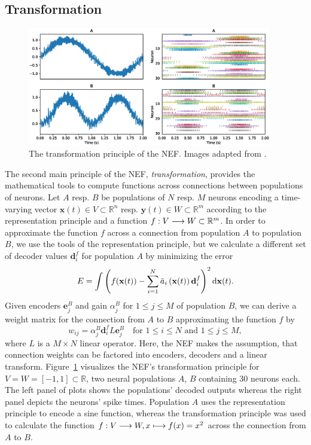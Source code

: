 \subsection{Transformation}
\begin{figure}[t]
	\centering
	\includegraphics[width=0.95\textwidth]{imgs/NEF_transformation.eps}
	\caption{The transformation principle of the \ac{NEF}.
    Images adapted from \textcite{Nengo}.}
	\label{fig:nef_transformation}
\end{figure}
The second main principle of the \ac{NEF}, \emph{transformation}, provides the mathematical tools to compute functions across connections between populations of neurons.
Let $A$ resp. $B$ be populations of $N$ resp. $M$ neurons encoding a time-varying vector $\mathbf{x}(t) \in V \subset \mathbb{R}^{n}$ resp. $\mathbf{y}(t) \in W \subset \mathbb{R}^{m}$ according to the representation principle and a function $f: V \longrightarrow W \subset \mathbb{R}^{m}$.
In order to approximate the function $f$ across a connection from population $A$ to population $B$, we use the tools of the representation principle, but we calculate a different set of decoder values $\mathbf{d}_{i}^{f}$ for population $A$ by minimizing the error
\begin{equation}
\label{eq:nef_transformation}
E = \int \left( f(\mathbf{x}(t)) - \sum_{i=1}^{N} \tilde{a}_{i}\left(\mathbf{x}(t)\right) \mathbf{d}_{i}^{f}\right)^{2} \mathop{}\!\mathrm{d} \mathbf{x}(t).
\end{equation}
Given encoders $\mathbf{e}_{j}^{B}$ and gain $\alpha_{j}^{B}$ for $1 \leq j \leq M$ of population $B$, we can derive a weight matrix for the connection from $A$ to $B$ approximating the function $f$ by
\begin{equation}
w_{ij} = \alpha_{j}^{B} \mathbf{d}_{i}^{f} L \mathbf{e}_{j}^{B} \quad \textrm{for } 1 \leq i \leq N \textrm{ and } 1 \leq j \leq M,
\end{equation}
where $L$ is a $M \times N$ linear operator.
Here, the \ac{NEF} makes the assumption, that connection weights can be factored into encoders, decoders and a linear transform.
Figure~\ref{fig:nef_transformation} visualizes the \ac{NEF}'s transformation principle for $V = W = \left[ -1, 1\right] \subset \mathbb{R}$, two neural populations $A$, $B$ containing $30$ neurons each.
The left panel of plots shows the populations' decoded outputs whereas the right panel depicts the neurons' spike times.
Population $A$ uses the representation principle to encode a sine function, whereas the transformation principle was used to calculate the function $f: V \longrightarrow W, x \longmapsto f(x)=x^{2}$ across the connection from $A$ to $B$.

